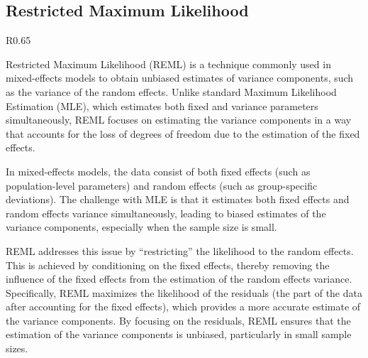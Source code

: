 \subsection{Restricted Maximum Likelihood}
\begin{wrapfigure}{R}{0.65\textwidth}
\begin{tcolorbox}[every float=\centering, drop shadow, title=Two-parameter MLE ,colback=white,colframe=WMgreen,
  colbacktitle=WMgreen,]
  \label{fig:MLEsurf}
 \end{tcolorbox}
 \end{wrapfigure}
Restricted Maximum Likelihood (REML) is a technique commonly used in mixed-effects models to obtain unbiased estimates of variance components, such as the variance of the random effects. Unlike standard Maximum Likelihood Estimation (MLE), which estimates both fixed and variance parameters simultaneously, REML focuses on estimating the variance components in a way that accounts for the loss of degrees of freedom due to the estimation of the fixed effects.

In mixed-effects models, the data consist of both fixed effects (such as population-level parameters) and random effects (such as group-specific deviations). The challenge with MLE is that it estimates both fixed effects and random effects variance simultaneously, leading to biased estimates of the variance components, especially when the sample size is small.

REML addresses this issue by ``restricting'' the likelihood to the random effects. This is achieved by conditioning on the fixed effects, thereby removing the influence of the fixed effects from the estimation of the random effects variance. Specifically, REML maximizes the likelihood of the residuals (the part of the data after accounting for the fixed effects), which provides a more accurate estimate of the variance components. By focusing on the residuals, REML ensures that the estimation of the variance components is unbiased, particularly in small sample sizes.

